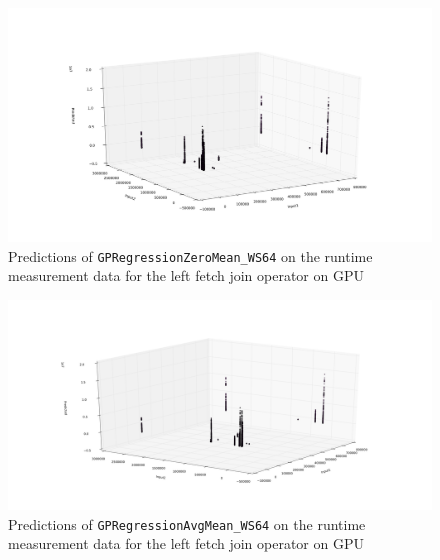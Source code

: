\begin{figure}[htbp]
  \centering
    \includegraphics[width=\linewidth]{./Figures/gpreg_zeromean_ws64_ocl_leftfetchjoin_on_gpu}
  \caption{Predictions of \texttt{GPRegressionZeroMean\_WS64} on the runtime measurement data for the left fetch join operator on GPU}
  \label{gpreg_zeromean_ws64_ocl_leftfetchjoin_on_gpu}
\end{figure}

\begin{figure}[htbp]
  \centering
    \includegraphics[width=\linewidth]{./Figures/gpreg_avgmean_ws64_ocl_leftfetchjoin_on_gpu}
  \caption{Predictions of \texttt{GPRegressionAvgMean\_WS64} on the runtime measurement data for the left fetch join operator on GPU}
  \label{gpreg_avgmean_ws64_ocl_leftfetchjoin_on_gpu}
\end{figure}

